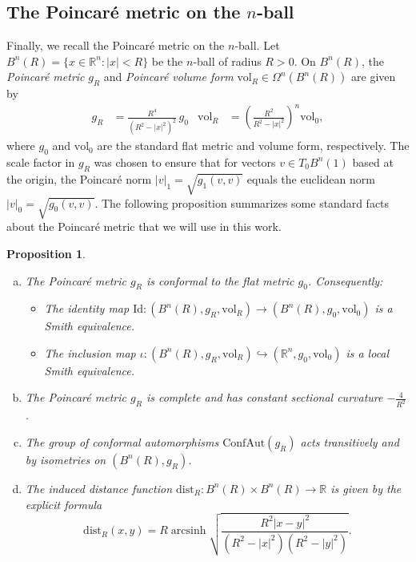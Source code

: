 \documentclass[11pt]{article}
\newcommand{\R}{\mathbb{R}}
\newcommand{\vol}{\mathrm{vol}}
\newtheorem{prop}[thm]{Proposition}
\theoremstyle{definition}
\numberwithin{equation}{section}
\begin{document}
\subsection{The Poincar\'{e} metric on the $n$-ball} \label{sub:Hyperbolic-Space}

\indent \indent Finally, we recall the Poincar\'{e} metric on the $n$-ball.  Let $B^n(R) = \{x \in \R^n \colon |x| < R\}$ be the $n$-ball of radius $R > 0$.  On $B^n(R)$, the \emph{Poincar\'{e} metric} $g_R$ and \emph{Poincar\'{e} volume form} $\vol_R \in \Omega^n(B^n(R))$ are given by
\begin{align*}
g_R & = \frac{R^4}{(R^2 - |x|^2)^2}\, g_0 & \vol_R & = \left( \frac{R^2}{R^2 - |x|^2} \right)^n \vol_0,
\end{align*}
where $g_0$ and $\vol_0$ are the standard flat metric and volume form, respectively.  The scale factor in $g_R$ was chosen to ensure that for vectors $v \in T_0B^n(1)$ based at the origin, the Poincar\'{e} norm $|v|_1 = \sqrt{g_1(v,v)}$ equals the euclidean norm $|v|_0 = \sqrt{g_0(v,v)}$.  The following proposition summarizes some standard facts about the Poincar\'{e} metric that we will use in this work.


\begin{prop} \label{prop:Poincare-Facts} ${}$
\begin{enumerate}[(a)]
\item The Poincar\'{e} metric $g_R$ is conformal to the flat metric $g_0$.  Consequently:
\begin{itemize}
\item The identity map $\mathrm{Id} \colon (B^n(R), g_R, \vol_R) \to (B^n(R), g_0, \vol_0)$ is a Smith equivalence.
\item The inclusion map $\iota \colon (B^n(R), g_R, \vol_R) \hookrightarrow (\R^n, g_0, \vol_0)$ is a local Smith equivalence.
\end{itemize}
\item The Poincar\'{e} metric $g_R$ is complete and has constant sectional curvature $-\frac{4}{R^2}$.
\item The group of conformal automorphisms $\mathrm{ConfAut}(g_R)$ acts transitively and by isometries on $(B^n(R), g_R)$.
\item The induced distance function $\mathrm{dist}_R \colon B^n(R) \times B^n(R) \to \R$ is given by the explicit formula
$$\mathrm{dist}_R(x,y) = R \operatorname{arcsinh}  \sqrt{\frac{R^2 |x-y|^2}{ (R^2 - |x|^2)(R^2 - |y|^2) }}.$$
\end{enumerate}
\end{prop}
\end{document}

